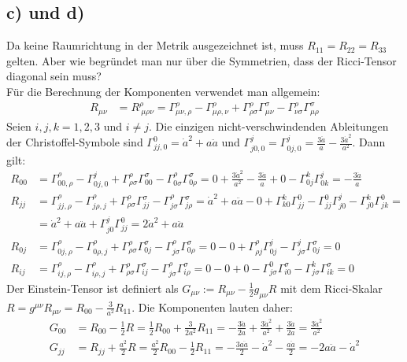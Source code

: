 \documentclass[a4paper,12pt]{article}
\begin{document}
\subsection*{c) und d)}Da keine Raumrichtung in der Metrik ausgezeichnet ist, muss $R_{11}=R_{22}=R_{33}$ gelten. Aber wie begründet man nur über die Symmetrien, dass der Ricci-Tensor diagonal sein muss?\\
Für die Berechnung der Komponenten verwendet man allgemein:
\begin{align*}
R_{\mu\nu}&=R^\rho_{\ \mu\rho\nu}=\Gamma^\rho_{\mu\nu,\rho}-\Gamma^\rho_{\mu\rho,\nu}+\Gamma^\rho_{\rho\sigma}\Gamma^\sigma_{\mu\nu}-\Gamma^\rho_{\nu\sigma}\Gamma^\sigma_{\mu\rho}
\end{align*}
Seien $i,j,k=1,2,3$ und $i\neq j$. Die einzigen nicht-verschwindenden Ableitungen der Christoffel-Symbole sind $\Gamma^0_{jj,0}=\dot{a}^2+a\ddot{a}$ und $\Gamma^j_{j0,0}=\Gamma^j_{0j,0}=\frac{3\ddot{a}}{a}-\frac{3\dot{a}^2}{a^2}$. Dann gilt:
\begin{align*}
R_{00}&=\Gamma^\rho_{00,\rho}-\Gamma^j_{0j,0}+\Gamma^\rho_{\rho\sigma}\Gamma^\sigma_{00}-\Gamma^\rho_{0\sigma}\Gamma^\sigma_{0\rho}=0+\frac{3\dot{a}^2}{a^2}-\frac{3\ddot{a}}{a}+0-\Gamma^k_{0j}\Gamma^j_{0k}=-\frac{3\ddot{a}}{a}\\
R_{jj}&=\Gamma^\rho_{jj,\rho}-\Gamma^\rho_{j\rho,j}+\Gamma^\rho_{\rho\sigma}\Gamma^\sigma_{jj}-\Gamma^\rho_{j\sigma}\Gamma^\sigma_{j\rho}=\dot{a}^2+a\ddot{a}-0+\Gamma^k_{k0}\Gamma^0_{jj}-\Gamma^0_{jj}\Gamma^j_{j0}-\Gamma^k_{j0}\Gamma^0_{jk}=\\
&=\dot{a}^2+a\ddot{a}+\Gamma^j_{j0}\Gamma^0_{jj}=2\dot{a}^2+a\ddot{a}\\
R_{0j}&=\Gamma^\rho_{0j,\rho}-\Gamma^\rho_{0\rho,j}+\Gamma^\rho_{\rho\sigma}\Gamma^\sigma_{0j}-\Gamma^\rho_{j\sigma}\Gamma^\sigma_{0\rho}=0-0+\Gamma^\rho_{\rho j}\Gamma^j_{0j}-\Gamma^j_{j\sigma}\Gamma^\sigma_{0j}=0\\
R_{ij}&=\Gamma^\rho_{ij,\rho}-\Gamma^\rho_{i\rho,j}+\Gamma^\rho_{\rho\sigma}\Gamma^\sigma_{ij}-\Gamma^\rho_{j\sigma}\Gamma^\sigma_{i\rho}=0-0+0-\Gamma^0_{j\sigma}\Gamma^\sigma_{i0}-\Gamma^k_{j\sigma}\Gamma^\sigma_{ik}=0
\end{align*}
Der Einstein-Tensor ist definiert als $G_{\mu\nu}:=R_{\mu\nu}-\frac{1}{2}g_{\mu\nu}R$ mit dem Ricci-Skalar $R=g^{\mu\nu}R_{\mu\nu}=R_{00}-\frac{3}{a^2} R_{11}$. Die Komponenten lauten daher:
\begin{align*}
G_{00}&=R_{00}-\frac{1}{2}R=\frac{1}{2}R_{00}+\frac{3}{2a^2}R_{11}=-\frac{3\ddot{a}}{2a}+\frac{3\dot{a}^2}{a^2}+\frac{3\ddot{a}}{2a}=\frac{3\dot{a}^2}{a^2}\\
G_{jj}&=R_{jj}+\frac{a^2}{2}R=\frac{a^2}{2}R_{00}-\frac{1}{2}R_{11}=-\frac{3a\ddot{a}}{2}-\dot{a}^2-\frac{a\ddot{a}}{2}=-2a\ddot{a}-\dot{a}^2
\end{align*}
\end{document}
